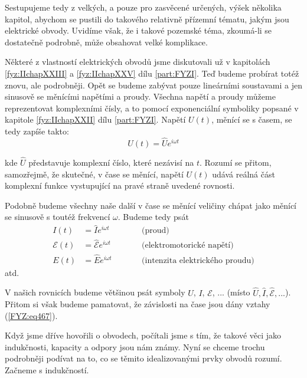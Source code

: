   Sestupujeme tedy z velkých, a pouze pro zasvěcené určených, výšek několika kapitol, abychom se 
  pustili do takového relativně přízemní tématu, jakým jsou elektrické obvody. Uvidíme však, že i 
  takové pozemské téma, zkoumá-li se dostatečně podrobně, může obsahovat velké komplikace.

  Některé z vlastností elektrických obvodů jsme diskutovali už v kapitolách \ref{fyz:IIchapXXIII} a 
  \ref{fyz:IIchapXXV} dílu \ref{part:FYZI}. Teď budeme probírat totéž znovu, ale podrobněji. Opět 
  se budeme zabývat pouze lineárními soustavami a jen sinusově se měnícími napětími a proudy. 
  Všechna napětí a proudy můžeme reprezentovat komplexními čísly, a to pomocí exponenciální 
  symboliky popsané v kapitole \ref{fyz:IIchapXXII} dílu \ref{part:FYZI}. Napětí \(U(t)\), 
  měnící se s časem, se tedy zapíše takto:
  \begin{equation}\label{fyz:eq466}
   U(t) = \hat{U}e^{i\omega t}
  \end{equation}
  
  kde \(\hat{U}\) představuje komplexní číslo, které nezávisí na \(t\). Rozumí se přitom, 
  samozřejmě, že skutečné, v čase se měnící, napětí \(U(t)\) udává reálná část komplexní funkce 
  vystupující na pravé straně uvedené rovnosti.
  
  Podobně budeme všechny naše další v čase se měnící veličiny chápat jako měnící se sinusově s 
  toutéž frekvencí \(\omega\). Budeme tedy psát
  \begin{subequations}\label{FYZ:eq467}
  \begin{alignat}{3}
    I(t) &= \hat{I}e^{i\omega t} &&\qquad\text{(proud)}                       \label{FYZ:eq467a} \\
    \mathscr{E}(t) 
         &= \hat{\mathscr{E}}e^{i\omega t} 
                                 &&\qquad\text{(elektromotorické napětí)}     \label{FYZ:eq467b} \\ 
    E(t) &= \hat{E}e^{i\omega t} &&\qquad\text{(intenzita elektrického proudu)} \label{FYZ:eq467c}
  \end{alignat}
  \end{subequations}
  atd. 
  
  V našich rovnicích budeme většinou psát symboly \(U\), \(I\), \(\mathscr{E}\), ... (místo 
  \(\hat{U}, \hat{I}, \hat{\mathscr{E}}, ...\)). Přitom si však budeme pamatovat, že závislosti na 
  čase jsou dány vztahy (\ref{FYZ:eq467}). 
  
  Když jsme dříve hovořili o obvodech, počítali jsme s tím, že takové věci jako indukčnosti, 
  kapacity a odpory jsou nám známy. Nyní se chceme trochu podrobněji podívat na to, co se těmito 
  idealizovanými prvky obvodů rozumí. Začneme s indukčností.


